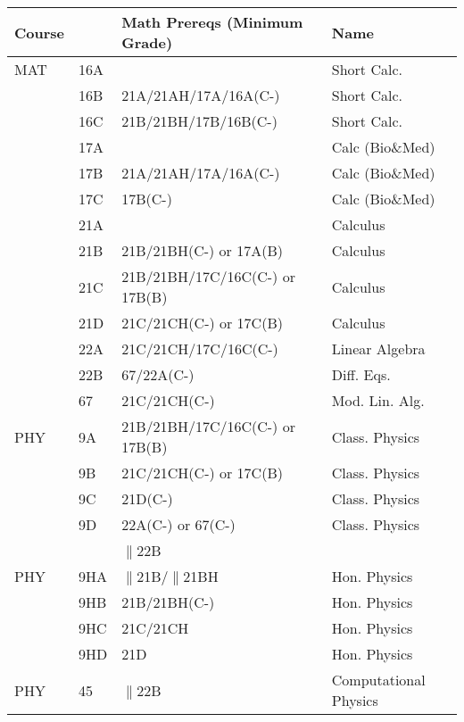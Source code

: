 \documentclass[12pt]{article}
\begin{document}
\newpage
\vskip 2cm 
\label{tbl:math-prereqs}
\begin{center}
\begin{tabular}{|llll|}
\hline
Course & & Math Prereqs (Minimum Grade)& Name \\
\hline
MAT & 16A & & Short Calc.\\
    & 16B & 21A/21AH/17A/16A(C-) & Short Calc.\\
    & 16C & 21B/21BH/17B/16B(C-) & Short Calc.\\
    & 17A &                      & Calc (Bio\&Med)\\
    & 17B & 21A/21AH/17A/16A(C-) & Calc (Bio\&Med)\\
    & 17C & 17B(C-)              & Calc (Bio\&Med)\\
    & 21A &                      & Calculus \\
    & 21B & 21B/21BH(C-) or 17A(B) & Calculus \\
    & 21C & 21B/21BH/17C/16C(C-) or 17B(B) & Calculus\\
    & 21D & 21C/21CH(C-) or 17C(B) & Calculus \\
    & 22A & 21C/21CH/17C/16C(C-)    & Linear Algebra \\
    & 22B & 67/22A(C-)           & Diff. Eqs. \\
    & 67  & 21C/21CH(C-)           & Mod. Lin. Alg. \\
\hline
\hline
PHY & 9A & 21B/21BH/17C/16C(C-) or 17B(B) & Class. Physics\\
    & 9B & 21C/21CH(C-) or 17C(B) & Class. Physics\\
    & 9C & 21D(C-) & Class. Physics\\
    & 9D & 22A(C-) or 67(C-) & Class. Physics\\
    &    & $\parallel$22B & \\
\hline
\hline
PHY & 9HA & $\parallel$21B/$\parallel$21BH & Hon. Physics\\
    & 9HB    & 21B/21BH(C-) & Hon. Physics \\
    & 9HC    & 21C/21CH & Hon. Physics \\
    & 9HD    & 21D  & Hon. Physics \\
\hline
PHY & 45     & $\parallel$22B & Computational Physics \\
\hline
\end{tabular}
\end{center}
\end{document}
